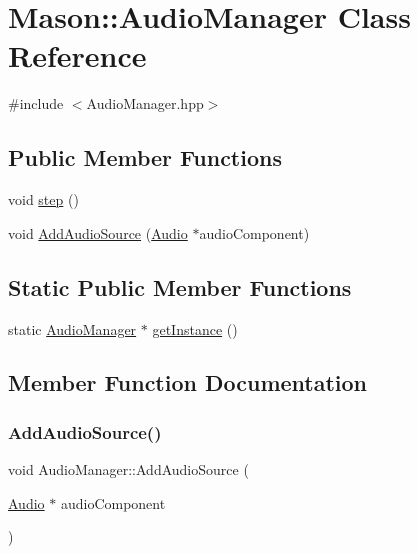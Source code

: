 \hypertarget{class_mason_1_1_audio_manager}{}\section{Mason\+:\+:Audio\+Manager Class Reference}
\label{class_mason_1_1_audio_manager}


{\ttfamily \#include $<$Audio\+Manager.\+hpp$>$}

\subsection*{Public Member Functions}
\begin{DoxyCompactItemize}
\item 
void \hyperlink{class_mason_1_1_audio_manager_a81eb2ff2bc2d1242e532c208b32d17ec}{step} ()
\item 
void \hyperlink{class_mason_1_1_audio_manager_aab6ee58a5f26c1397ca72af21247d46d}{Add\+Audio\+Source} (\hyperlink{class_mason_1_1_audio}{Audio} $\ast$audio\+Component)
\end{DoxyCompactItemize}
\subsection*{Static Public Member Functions}
\begin{DoxyCompactItemize}
\item 
static \hyperlink{class_mason_1_1_audio_manager}{Audio\+Manager} $\ast$ \hyperlink{class_mason_1_1_audio_manager_a77de22887544ce37ae13d7c4d5cf7a79}{get\+Instance} ()
\end{DoxyCompactItemize}


\subsection{Member Function Documentation}
\hypertarget{class_mason_1_1_audio_manager_aab6ee58a5f26c1397ca72af21247d46d}{}\label{class_mason_1_1_audio_manager_aab6ee58a5f26c1397ca72af21247d46d} 
\subsubsection{\texorpdfstring{Add\+Audio\+Source()}{AddAudioSource()}}
{\footnotesize\ttfamily void Audio\+Manager\+::\+Add\+Audio\+Source (\begin{DoxyParamCaption}\item[{\hyperlink{class_mason_1_1_audio}{Audio} $\ast$}]{audio\+Component }\end{DoxyParamCaption})}

